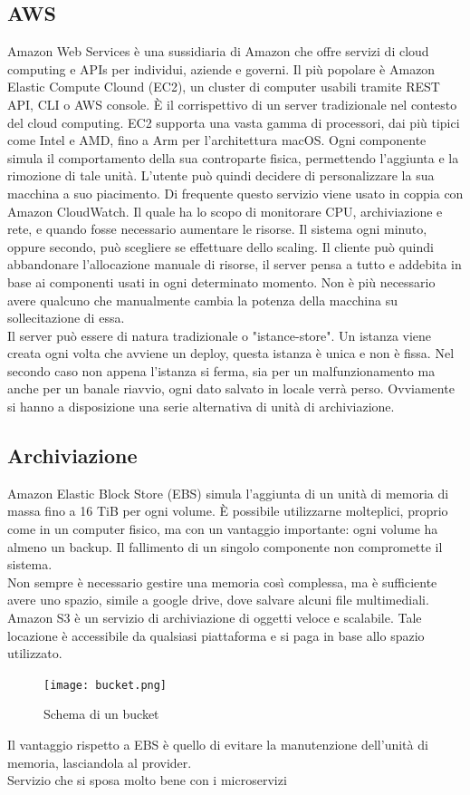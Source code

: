 \documentclass[12pt]{article}
\begin{document}
\subsection{AWS}
Amazon Web Services è una sussidiaria di Amazon che offre servizi di cloud 
computing e APIs per individui, aziende e governi.
Il più popolare è Amazon Elastic Compute Clound (EC2), 
un cluster di computer usabili tramite REST API, CLI o AWS console.
È il corrispettivo di un server tradizionale nel contesto del cloud computing. 
EC2 supporta una vasta gamma di processori, dai più tipici come Intel e AMD, 
fino a Arm per l'architettura macOS.
Ogni componente simula il comportamento della sua controparte fisica, permettendo 
l'aggiunta e la rimozione di tale unità. 
L'utente può quindi decidere di personalizzare la sua macchina a suo piacimento. 
Di frequente questo servizio viene usato in coppia con Amazon CloudWatch. 
Il quale ha lo scopo di monitorare CPU, archiviazione e rete, e quando fosse 
necessario aumentare le risorse.
Il sistema ogni minuto, oppure secondo, può scegliere se effettuare dello 
scaling.
Il cliente può quindi abbandonare l'allocazione manuale di risorse, il server 
pensa a tutto e addebita in base ai componenti usati in ogni determinato momento. 
Non è più necessario avere qualcuno che manualmente cambia la potenza della 
macchina su sollecitazione di essa.
\\ Il server può essere di natura tradizionale o "istance-store". 
Un istanza viene creata ogni volta che avviene un deploy, questa istanza è 
unica e non è fissa.
Nel secondo caso non appena l'istanza si ferma, sia per un malfunzionamento 
ma anche per un banale riavvio, ogni dato salvato in locale verrà perso. 
Ovviamente si hanno a disposizione una serie alternativa di unità di archiviazione.

\subsection{Archiviazione}
Amazon Elastic Block Store (EBS) simula l'aggiunta di un unità di memoria di 
massa fino a 16 TiB per ogni volume. 
È possibile utilizzarne molteplici, proprio come in un computer fisico, ma con 
un vantaggio importante: ogni volume ha almeno un backup. 
Il fallimento di un singolo componente non compromette il sistema.
\\ Non sempre è necessario gestire una memoria così complessa, ma è sufficiente 
avere uno spazio, simile a google drive, dove salvare alcuni file multimediali.
Amazon S3 è un servizio di archiviazione di oggetti veloce e scalabile. 
Tale locazione è accessibile da qualsiasi piattaforma e si paga in base allo 
spazio utilizzato.
\begin{figure}[H]
\texttt{[image: bucket.png]}
\centering
\caption{Schema di un bucket}
\end{figure}
Il vantaggio rispetto a EBS è quello di evitare la manutenzione dell'unità 
di memoria, lasciandola al provider. 
\\ Servizio che si sposa molto bene con i microservizi
\end{document}
